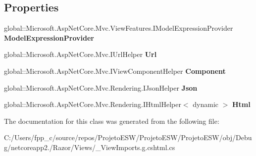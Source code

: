 \subsection*{Properties}
\begin{DoxyCompactItemize}
\item 
\mbox{\label{class_asp_net_core_1_1_views_____view_imports_a23a21b8563a4d761cd686c59665d8430}} 
global\+::\+Microsoft.\+Asp\+Net\+Core.\+Mvc.\+View\+Features.\+I\+Model\+Expression\+Provider {\bfseries Model\+Expression\+Provider}
\item 
\mbox{\label{class_asp_net_core_1_1_views_____view_imports_a7d5e0124c79f9983509d95fb2fdfd051}} 
global\+::\+Microsoft.\+Asp\+Net\+Core.\+Mvc.\+I\+Url\+Helper {\bfseries Url}
\item 
\mbox{\label{class_asp_net_core_1_1_views_____view_imports_a5d8958fb82215117132f2831328944b8}} 
global\+::\+Microsoft.\+Asp\+Net\+Core.\+Mvc.\+I\+View\+Component\+Helper {\bfseries Component}
\item 
\mbox{\label{class_asp_net_core_1_1_views_____view_imports_af633af8e5391898595031b553b1bb925}} 
global\+::\+Microsoft.\+Asp\+Net\+Core.\+Mvc.\+Rendering.\+I\+Json\+Helper {\bfseries Json}
\item 
\mbox{\label{class_asp_net_core_1_1_views_____view_imports_ab39bb7fab04076355f74484eda90a67f}} 
global\+::\+Microsoft.\+Asp\+Net\+Core.\+Mvc.\+Rendering.\+I\+Html\+Helper$<$ dynamic $>$ {\bfseries Html}
\end{DoxyCompactItemize}


The documentation for this class was generated from the following file\+:\begin{DoxyCompactItemize}
\item 
C\+:/\+Users/fpp\+\_\+c/source/repos/\+Projeto\+E\+S\+W/\+Projeto\+E\+S\+W/\+Projeto\+E\+S\+W/obj/\+Debug/netcoreapp2./\+Razor/\+Views/\+\_\+\+View\+Imports.\+g.\+cshtml.\+cs\end{DoxyCompactItemize}
